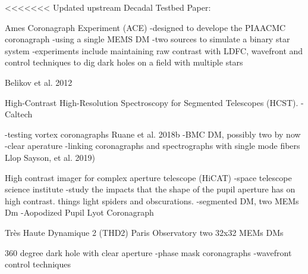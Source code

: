 <<<<<<< Updated upstream
Decadal Testbed Paper:

Ames Coronagraph Experiment (ACE)
-designed to develope the PIAACMC coronagraph
-using a single MEMS DM
-two sources to simulate a binary star system
-experiments include maintaining raw contrast with LDFC, wavefront and control techniques to dig dark holes on a field with multiple stars

Belikov et al. 2012

High-Contrast High-Resolution Spectroscopy for Segmented Telescopes (HCST).
-Caltech

-testing vortex coronagraphs Ruane et al. 2018b
-BMC DM, possibly two by now
-clear aperature
-linking coronagraphs and spectrographs with single mode fibers
Llop Sayson, et al. 2019)

High contrast imager for complex aperture telescope (HiCAT)
-space telescope science institute
-study the impacts that the shape of the pupil aperture has on high contrast. things light spiders and obscurations. 
-segmented DM, two MEMs Dm
-Aopodized Pupil Lyot Coronagraph

Très Haute Dynamique 2 (THD2)
Paris Observatory
two 32x32 MEMs DMs

360 degree dark hole with clear aperture
-phase mask coronagraphs
-wavefront control techniques



    
        






